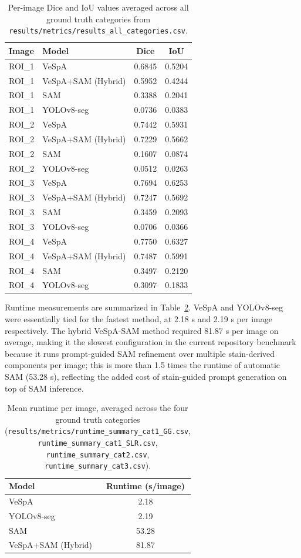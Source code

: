 \begin{table}[htbp]
\centering
\caption{Per-image Dice and IoU values averaged across all ground truth categories from \texttt{results/metrics/results\_all\_categories.csv}.}
\label{tab:per_image_results}
\begin{tabular}{llcc}
\hline
Image & Model & Dice & IoU \\
\hline
ROI\_1 & VeSpA & 0.6845 & 0.5204 \\
ROI\_1 & VeSpA+SAM (Hybrid) & 0.5952 & 0.4244 \\
ROI\_1 & SAM & 0.3388 & 0.2041 \\
ROI\_1 & YOLOv8-seg & 0.0736 & 0.0383 \\
ROI\_2 & VeSpA & 0.7442 & 0.5931 \\
ROI\_2 & VeSpA+SAM (Hybrid) & 0.7229 & 0.5662 \\
ROI\_2 & SAM & 0.1607 & 0.0874 \\
ROI\_2 & YOLOv8-seg & 0.0512 & 0.0263 \\
ROI\_3 & VeSpA & 0.7694 & 0.6253 \\
ROI\_3 & VeSpA+SAM (Hybrid) & 0.7247 & 0.5692 \\
ROI\_3 & SAM & 0.3459 & 0.2093 \\
ROI\_3 & YOLOv8-seg & 0.0706 & 0.0366 \\
ROI\_4 & VeSpA & 0.7750 & 0.6327 \\
ROI\_4 & VeSpA+SAM (Hybrid) & 0.7487 & 0.5991 \\
ROI\_4 & SAM & 0.3497 & 0.2120 \\
ROI\_4 & YOLOv8-seg & 0.3097 & 0.1833 \\
\hline
\end{tabular}
\end{table}

Runtime measurements are summarized in Table~\ref{tab:runtime}. VeSpA and YOLOv8-seg were essentially tied for the fastest method, at 2.18 s and 2.19 s per image respectively. The hybrid VeSpA-SAM method required 81.87 s per image on average, making it the slowest configuration in the current repository benchmark because it runs prompt-guided SAM refinement over multiple stain-derived components per image; this is more than 1.5 times the runtime of automatic SAM (53.28 s), reflecting the added cost of stain-guided prompt generation on top of SAM inference.

\begin{table}[htbp]
\centering
\caption{Mean runtime per image, averaged across the four ground truth categories (\texttt{results/metrics/runtime\_summary\_cat1\_GG.csv}, \texttt{runtime\_summary\_cat1\_SLR.csv}, \texttt{runtime\_summary\_cat2.csv}, \texttt{runtime\_summary\_cat3.csv}).}
\label{tab:runtime}
\begin{tabular}{lc}
\hline
Model & Runtime (s/image) \\
\hline
VeSpA & 2.18 \\
YOLOv8-seg & 2.19 \\
SAM & 53.28 \\
VeSpA+SAM (Hybrid) & 81.87 \\
\hline
\end{tabular}
\end{table}

